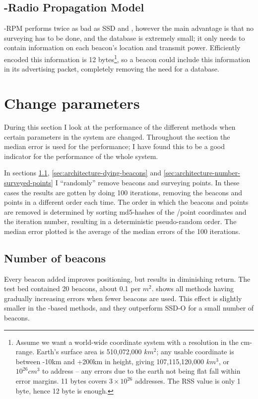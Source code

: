 \subsection{\BRP-Radio Propagation Model}
\label{sec:architecture-measurements-brp-rpm}
\aBRP-RPM performs twice as bad as SSD and \aBRP, however the main advantage is that no surveying has to be done, and the database is extremely small; it only needs to contain information on each beacon's location and transmit power.
Efficiently encoded this information is 12 bytes\footnote{
    Assume we want a world-wide coordinate system with a resolution in the cm-range.
    Earth's surface area is 510,072,000 $km^2$; any usable coordinate is between -10km and +200km in height, giving 107,115,120,000 $km^3$, or $10^{26} cm^3$ to address -- any errors due to the earth not being flat fall within error margins.
    11 bytes covers $3\times 10^{26}$ addresses.
    The RSS value is only 1 byte, hence 12 byte is enough.
}, so a beacon could include this information in its advertising packet, completely removing the need for a database.

\section{Change parameters}
During this section I look at the performance of the different methods when certain parameters in the system are changed.
Throughout the section the median error is used for the performance; I have found this to be a good indicator for the performance of the whole system.

In sections \ref{sec:architecture-number-beacons}, \ref{sec:architecture-dying-beacons} and \ref{sec:architecture-number-surveyed-points} I ``randomly'' remove beacons and surveying points.
In these cases the results are gotten by doing 100 iterations, removing the beacons and points in a different order each time.
The order in which the beacons and points are removed is determined by sorting md5-hashes of the \bid/point coordinates and the iteration number, resulting in a deterministic pseudo-random order.
The median error plotted is the average of the median errors of the 100 iterations.


\subsection{Number of beacons}
\label{sec:architecture-number-beacons}
Every beacon added improves positioning, but results in diminishing return.
The test bed contained 20 beacons, about 0.1 per $m^2$.
 shows all methods having gradually increasing errors when fewer beacons are used.
This effect is slightly smaller in the \aBRP-based methods, and they outperform SSD-O for a small number of beacons.


